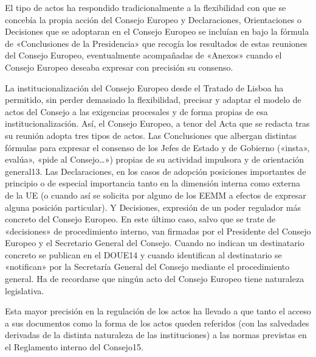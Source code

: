 \documentclass[10pt,a4paper]{article}
\begin{document}
El tipo de actos ha respondido tradicionalmente a la flexibilidad con que se concebía la propia acción del Consejo Europeo y Declaraciones, Orientaciones o Decisiones que se adoptaran en el Consejo Europeo se incluían en bajo la fórmula de «Conclusiones de la Presidencia» que recogía los resultados de estas reuniones del Consejo Europeo, eventualmente acompañadas de «Anexos» cuando el Consejo Europeo deseaba expresar con precisión su consenso.

La institucionalización del Consejo Europeo desde el Tratado de Lisboa ha permitido, sin perder demasiado la flexibilidad, precisar y adaptar el modelo de actos del Consejo a las exigencias procesales y de forma propias de esa institucionalización. Así, el Consejo Europeo, a tenor del Acta que se redacta tras su reunión adopta tres tipos de actos. Las Conclusiones que albergan distintas fórmulas para expresar el consenso de los Jefes de Estado y de Gobierno («insta», evalúa», «pide al Consejo…») propias de su actividad impulsora y de orientación general13. Las Declaraciones, en los casos de adopción posiciones importantes de principio o de especial importancia tanto en la dimensión interna como externa de la UE (o cuando así se solicita por alguno de los EEMM a efectos de expresar alguna posición particular). Y Decisiones, expresión de un poder regulador más concreto del Consejo Europeo. En este último caso, salvo que se trate de «decisiones» de procedimiento interno, van firmadas por el Presidente del Consejo Europeo y el Secretario General del Consejo. Cuando no indican un destinatario concreto se publican en el DOUE14 y cuando identifican al destinatario se «notifican» por la Secretaría General del Consejo mediante el procedimiento general. Ha de recordarse que ningún acto del Consejo Europeo tiene naturaleza legislativa.

Esta mayor precisión en la regulación de los actos ha llevado a que tanto el acceso a sus documentos como la forma de los actos queden referidos (con las salvedades derivadas de la distinta naturaleza de las instituciones) a las normas previstas en el Reglamento interno del Consejo15.
\end{document}
